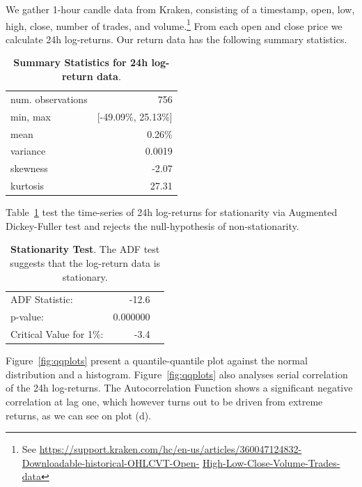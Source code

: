 \documentclass[english,11pt]{article}
\begin{document}
We gather 1-hour candle data from Kraken, consisting of a timestamp, open, low,
high, close, number of trades, and volume.\footnote{See \url{https://support.kraken.com/hc/en-us/articles/360047124832-Downloadable-historical-OHLCVT-Open-} \url{High-Low-Close-Volume-Trades-data}}
From each open and close price we calculate 24h log-returns. Our return data has the following summary statistics.
\begin{table}[!h]
\caption{\textbf{Summary Statistics for 24h log-return data}.}
\centering
\begin{tabular}{lr}
\hline
num. observations & 756\\
min, max &[-49.09\%, 25.13\%] \\
mean & 0.26\% \\
variance & 0.0019 \\ 
skewness & -2.07 \\
kurtosis & 27.31 \\
\hline
\end{tabular}
\end{table}
Table~\ref{tab:adf} test the time-series of 24h log-returns for stationarity via Augmented Dickey-Fuller test and rejects the null-hypothesis
of non-stationarity.
\begin{table}[!h]
\caption{\textbf{Stationarity Test}. The ADF test suggests that the log-return data is stationary.\label{tab:adf}}
\centering
\begin{tabular}{lrr}
\hline
ADF Statistic: &-12.6\\
p-value: &0.000000\\
Critical Value for 1\%:& -3.4\\
\hline
\end{tabular}
\end{table}

Figure~\ref{fig:qqplots} present a quantile-quantile plot against the normal distribution
and a histogram. Figure~\ref{fig:qqplots} also analyses serial correlation of the
24h log-returns. The Autocorrelation Function shows a significant negative correlation
at lag one, which however turns out to be driven from extreme returns, as we can
see on plot (d).
\end{document}
